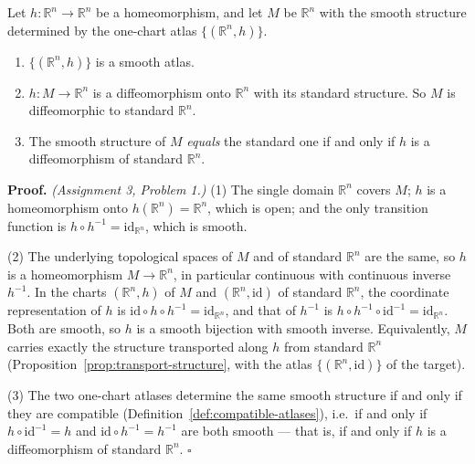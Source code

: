 \documentclass[11pt]{report}
\makeatletter
\newcounter{thmcounter}[section]
\renewenvironment{proof}[1][Proof]{\noindent\textbf{#1.} }{\hfill$\square$\par\vspace{5pt}}
\newcommand{\thmlabel}[1]{\edef\@currentlabel{\arabic{section}.\arabic{thmcounter}}\label{#1}}
\newcommand{\leeref}[1]{\par\smallskip{\raggedleft\footnotesize\textsc{Lee}:\ #1\par}}
\makeatother
\begin{document}
\begin{corbox}\thmlabel{cor:single-chart-Rn}
Let $h : \mathbb{R}^n \to \mathbb{R}^n$ be a homeomorphism, and let $M$ be $\mathbb{R}^n$ with the smooth structure determined by the one-chart atlas $\{(\mathbb{R}^n, h)\}$.
\begin{enumerate}
    \item $\{(\mathbb{R}^n, h)\}$ is a smooth atlas.
    \item $h : M \to \mathbb{R}^n$ is a diffeomorphism onto $\mathbb{R}^n$ with its standard structure. So $M$ is diffeomorphic to standard $\mathbb{R}^n$.
    \item The smooth structure of $M$ \emph{equals} the standard one if and only if $h$ is a diffeomorphism of standard $\mathbb{R}^n$.
\end{enumerate}
\leeref{Example 1.23 and Problem 1-6}
\end{corbox}

\begin{proof}
\textit{(Assignment 3, Problem 1.)} (1) The single domain $\mathbb{R}^n$ covers $M$; $h$ is a homeomorphism onto $h(\mathbb{R}^n) = \mathbb{R}^n$, which is open; and the only transition function is $h \circ h^{-1} = \mathrm{id}_{\mathbb{R}^n}$, which is smooth.

(2) The underlying topological spaces of $M$ and of standard $\mathbb{R}^n$ are the same, so $h$ is a homeomorphism $M \to \mathbb{R}^n$, in particular continuous with continuous inverse $h^{-1}$. In the charts $(\mathbb{R}^n, h)$ of $M$ and $(\mathbb{R}^n, \mathrm{id})$ of standard $\mathbb{R}^n$, the coordinate representation of $h$ is $\mathrm{id} \circ h \circ h^{-1} = \mathrm{id}_{\mathbb{R}^n}$, and that of $h^{-1}$ is $h \circ h^{-1} \circ \mathrm{id}^{-1} = \mathrm{id}_{\mathbb{R}^n}$. Both are smooth, so $h$ is a smooth bijection with smooth inverse. Equivalently, $M$ carries exactly the structure transported along $h$ from standard $\mathbb{R}^n$ (Proposition~\ref{prop:transport-structure}, with the atlas $\{(\mathbb{R}^n, \mathrm{id})\}$ of the target).

(3) The two one-chart atlases determine the same smooth structure if and only if they are compatible (Definition~\ref{def:compatible-atlases}), i.e.\ if and only if $h \circ \mathrm{id}^{-1} = h$ and $\mathrm{id} \circ h^{-1} = h^{-1}$ are both smooth --- that is, if and only if $h$ is a diffeomorphism of standard $\mathbb{R}^n$.
\end{proof}
\end{document}
